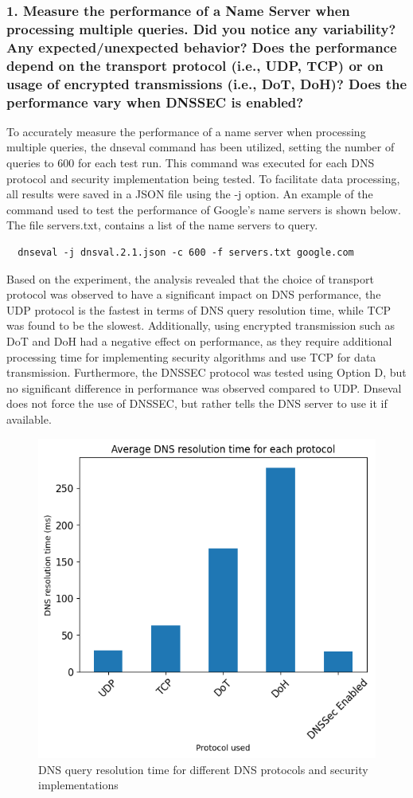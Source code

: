 \documentclass[eng]{class}
\begin{document}
\subsubsection*{1. Measure the performance of a Name Server when processing multiple queries. Did
  you notice any variability? Any expected/unexpected behavior? Does the
  performance depend on the transport protocol (i.e., UDP, TCP) or on usage of
  encrypted transmissions (i.e., DoT, DoH)? Does the performance vary when
  DNSSEC is enabled?}
To accurately measure the performance of a name server when processing multiple queries,
the dnseval command has been utilized, setting the number of queries to 600 for each test run.
This command was executed for each DNS protocol and security implementation being tested.
To facilitate data processing, all results were saved in a JSON file using the -j option.\newline
An example of the command used to test the performance of Google's name servers is shown below.\newline
The file servers.txt, contains a list of the name servers to query.
\begin{lstlisting}
  dnseval -j dnsval.2.1.json -c 600 -f servers.txt google.com
\end{lstlisting}
Based on the experiment, the analysis revealed that  the choice of transport protocol was observed to have a significant impact on DNS performance,
the UDP protocol is the fastest in terms of DNS query resolution time, while TCP was found to be the slowest.
Additionally, using encrypted transmission such as DoT and DoH had a negative effect on performance,
as they require additional processing time for implementing security algorithms and use TCP for data transmission.
Furthermore, the DNSSEC protocol was tested using Option D, but no significant difference in performance was observed compared to UDP.
Dnseval does not force the use of DNSSEC, but rather tells the DNS server to use it if available.

\begin{figure}[H]
  \centering
  \includegraphics[width=.7\columnwidth]{images/avgLat2.1.png}
  \caption{DNS query resolution time for different DNS protocols and security implementations}
  \label{fig-5}
\end{figure}
\end{document}
